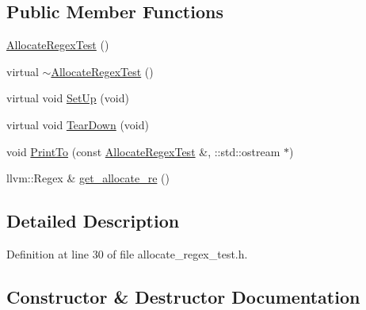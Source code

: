 \subsection*{Public Member Functions}
\begin{DoxyCompactItemize}
\item 
\hyperlink{classclang_1_1tidy_1_1pagesjaunes_1_1test_1_1_allocate_regex_test_af1150907e6d6c3499cf315455603a51d}{Allocate\+Regex\+Test} ()
\item 
virtual \hyperlink{classclang_1_1tidy_1_1pagesjaunes_1_1test_1_1_allocate_regex_test_aada9c8ed40e79ab794f8c26e5e28821a}{$\sim$\+Allocate\+Regex\+Test} ()
\item 
virtual void \hyperlink{classclang_1_1tidy_1_1pagesjaunes_1_1test_1_1_allocate_regex_test_ab1a41ec193c7c642096e331ba1fbcfb8}{Set\+Up} (void)
\item 
virtual void \hyperlink{classclang_1_1tidy_1_1pagesjaunes_1_1test_1_1_allocate_regex_test_aa6410db11e1375dc967e991b837d4370}{Tear\+Down} (void)
\item 
void \hyperlink{classclang_1_1tidy_1_1pagesjaunes_1_1test_1_1_allocate_regex_test_acf39827995aece77224fe2e553f8b4d2}{Print\+To} (const \hyperlink{classclang_1_1tidy_1_1pagesjaunes_1_1test_1_1_allocate_regex_test}{Allocate\+Regex\+Test} \&, \+::std\+::ostream $\ast$)
\item 
llvm\+::\+Regex \& \hyperlink{classclang_1_1tidy_1_1pagesjaunes_1_1test_1_1_allocate_regex_test_afbfeaeac380124749cdc8651f3190976}{get\+\_\+allocate\+\_\+re} ()
\end{DoxyCompactItemize}


\subsection{Detailed Description}


Definition at line 30 of file allocate\+\_\+regex\+\_\+test.\+h.



\subsection{Constructor \& Destructor Documentation}
\mbox{\label{classclang_1_1tidy_1_1pagesjaunes_1_1test_1_1_allocate_regex_test_af1150907e6d6c3499cf315455603a51d}} 
